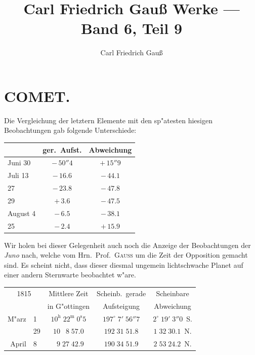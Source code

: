 \documentclass[12pt,a4paper]{article}
\title{Carl Friedrich Gauß Werke --- Band 6, Teil 9}
\author{Carl Friedrich Gauß}
\date{}
\begin{document}
\maketitle
\thispagestyle{empty}
\newpage
\setcounter{page}{391}

\section*{COMET.}

Die Vergleichung der letztern Elemente mit den sp"atesten hiesigen Beobachtungen gab folgende
Unterschiede:

\begin{center}
\begin{tabular}{l|c|c}
\toprule
& ger.~Aufst. & Abweichung \\
\midrule
Juni 30 & $-\,50''4$ & $+\,15''9$ \\
Juli 13 & $-\,16.6$ & $-\,44.1$ \\
\phantom{13} 27 & $-\,23.8$ & $-\,47.8$ \\
\phantom{13} 29 & $+\,3.6$ & $-\,47.5$ \\
August \phantom{0}4 & $-\,6.5$ & $-\,38.1$ \\
\phantom{13} 25 & $-\,2.4$ & $+\,15.9$ \\
\bottomrule
\end{tabular}
\end{center}

Wir holen bei dieser Gelegenheit auch noch die Anzeige der Beobachtungen der \textit{Juno} nach,
welche vom Hrn.~Prof.~\textsc{Gauss} um die Zeit der Opposition gemacht sind. Es scheint nicht, dass dieser
diesmal ungemein lichtschwache Planet auf einer andern Sternwarte beobachtet w"are.

\begin{center}
\begin{tabular}{r@{~}l|c|c|c}
\toprule
\multicolumn{2}{c|}{1815} & Mittlere Zeit & Scheinb.~gerade & Scheinbare \\
\multicolumn{2}{c|}{} & in G"ottingen & Aufsteigung & Abweichung \\
\midrule
M"arz & 1  & $10^{\mathrm{h}}\;22^{\mathrm{m}}\;0^{\mathrm{s}}5$ & $197^{\circ}\;7'\;56''7$ & $2^{\circ}\;19'\;3''0$~S. \\
     & 29 & $10\;\phantom{0}8\;57.0$ & $192\;31\;51.8$ & $1\;32\;30.1$~N. \\
April & 8 & $\phantom{0}9\;27\;42.9$ & $190\;34\;51.9$ & $2\;53\;24.2$~N. \\
\bottomrule
\end{tabular}
\end{center}
\end{document}
